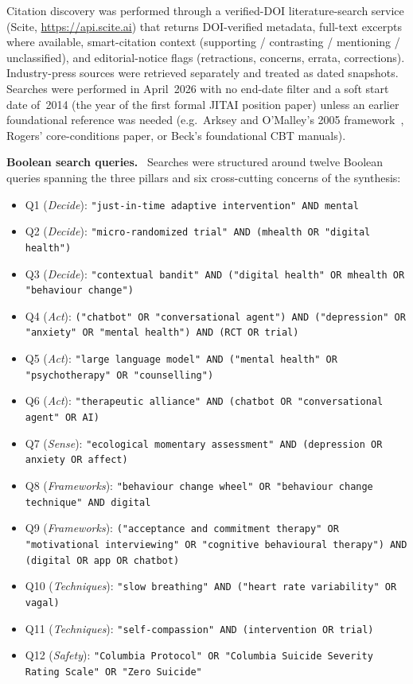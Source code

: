 \documentclass[10pt,conference]{article}
\renewcommand{\paragraph}[1]{\smallskip\par\noindent\textbf{#1}~\ignorespaces}
\begin{document}
Citation discovery was performed through a verified-DOI literature-search
service (Scite, \url{https://api.scite.ai}) that returns DOI-verified
metadata, full-text excerpts where available, smart-citation context
(supporting / contrasting / mentioning / unclassified), and
editorial-notice flags (retractions, concerns, errata, corrections).
Industry-press sources were retrieved separately and treated as dated
snapshots. Searches were performed in April~2026 with no end-date filter
and a soft start date of~2014 (the year of the first formal JITAI
position paper) unless an earlier foundational reference was needed
(e.g.~Arksey and O'Malley's 2005 framework~\cite{Arksey2005Scoping},
Rogers' core-conditions paper, or Beck's foundational CBT manuals).

\paragraph{Boolean search queries.}
Searches were structured around twelve Boolean queries spanning the
three pillars and six cross-cutting concerns of the synthesis:

\begin{itemize}\setlength{\itemsep}{0pt}
  \item Q1 (\emph{Decide}): \texttt{"just-in-time adaptive intervention" AND mental}
  \item Q2 (\emph{Decide}): \texttt{"micro-randomized trial" AND (mhealth OR "digital health")}
  \item Q3 (\emph{Decide}): \texttt{"contextual bandit" AND ("digital health" OR mhealth OR "behaviour change")}
  \item Q4 (\emph{Act}): \texttt{("chatbot" OR "conversational agent") AND ("depression" OR "anxiety" OR "mental health") AND (RCT OR trial)}
  \item Q5 (\emph{Act}): \texttt{"large language model" AND ("mental health" OR "psychotherapy" OR "counselling")}
  \item Q6 (\emph{Act}): \texttt{"therapeutic alliance" AND (chatbot OR "conversational agent" OR AI)}
  \item Q7 (\emph{Sense}): \texttt{"ecological momentary assessment" AND (depression OR anxiety OR affect)}
  \item Q8 (\emph{Frameworks}): \texttt{"behaviour change wheel" OR "behaviour change technique" AND digital}
  \item Q9 (\emph{Frameworks}): \texttt{("acceptance and commitment therapy" OR "motivational interviewing" OR "cognitive behavioural therapy") AND (digital OR app OR chatbot)}
  \item Q10 (\emph{Techniques}): \texttt{"slow breathing" AND ("heart rate variability" OR vagal)}
  \item Q11 (\emph{Techniques}): \texttt{"self-compassion" AND (intervention OR trial)}
  \item Q12 (\emph{Safety}): \texttt{"Columbia Protocol" OR "Columbia Suicide Severity Rating Scale" OR "Zero Suicide"}
\end{itemize}
\end{document}
